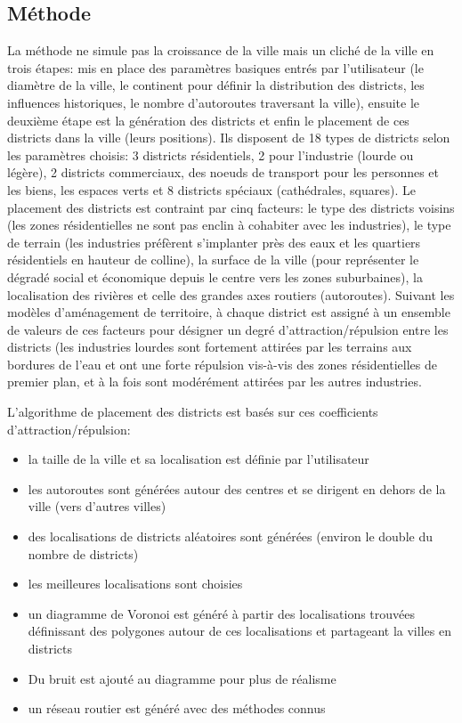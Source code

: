 \documentclass[11pt]{article}
\begin{document}
\subsection{Méthode}

La méthode ne simule pas la croissance de la ville mais un cliché de la ville en trois étapes: mis en place des paramètres basiques entrés par l'utilisateur (le diamètre de la ville, le continent pour définir la distribution des districts, les influences historiques, le nombre d'autoroutes traversant la ville), ensuite le deuxième étape est la génération des districts et enfin le placement de ces districts dans la ville (leurs positions). Ils disposent de 18 types de districts selon les paramètres choisis: 3 districts résidentiels, 2 pour l'industrie (lourde ou légère), 2 districts commerciaux, des noeuds de transport pour les personnes et les biens, les espaces verts et 8 districts spéciaux (cathédrales, squares).
Le placement des districts est contraint par cinq facteurs: le type des districts voisins (les zones résidentielles ne sont pas enclin à cohabiter avec les industries), le type de terrain (les industries préfèrent s'implanter près des eaux et les quartiers résidentiels en hauteur de colline), la surface de la ville (pour représenter le dégradé social et économique depuis le centre vers les zones suburbaines), la localisation des rivières et celle des grandes axes routiers (autoroutes).
Suivant les modèles d'aménagement de territoire, à chaque district est assigné à un ensemble de valeurs de ces facteurs pour désigner un degré d'attraction/répulsion entre les districts (les industries lourdes sont fortement attirées par les terrains aux bordures de l'eau et ont une forte répulsion vis-à-vis des zones résidentielles de premier plan, et à la fois sont modérément attirées par les autres industries.

L'algorithme de placement des districts est basés sur ces coefficients d'attraction/répulsion:
\begin{itemize}
	\item la taille de la ville et sa localisation est définie par l'utilisateur
	\item les autoroutes sont générées autour des centres et se dirigent en dehors de la ville (vers d'autres villes)
	\item des localisations de districts aléatoires sont générées (environ le double du nombre de districts)
	\item les meilleures localisations sont choisies
	\item un diagramme de Voronoi est généré à partir des localisations trouvées définissant des polygones autour de ces localisations et partageant la villes en districts
	\item Du bruit est ajouté au diagramme pour plus de réalisme
	\item un réseau routier est généré avec des méthodes connus\newline
\end{itemize}
\end{document}
